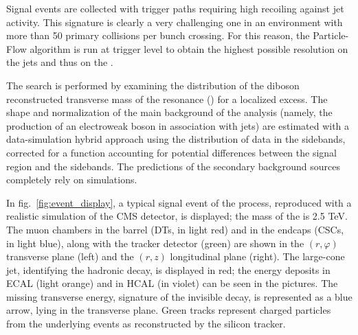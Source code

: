 \noindent Signal events are collected with trigger paths requiring high \met recoiling against jet activity. This signature is clearly a very challenging one in an environment with more than 50 primary collisions per bunch crossing. For this reason, the Particle-Flow algorithm is run at trigger level to obtain the highest possible resolution on the jets and thus on the \met.

\noindent The search is performed by examining the distribution of the diboson reconstructed transverse mass of the resonance \VZ (\mtVZ) for a localized excess. The shape and normalization of the main background of the analysis (namely, the production of an electroweak boson in association with jets) are estimated with a data-simulation hybrid approach using the distribution of data in the sidebands, corrected for a function accounting for potential differences between the signal region and the sidebands. The predictions of the secondary background sources completely rely on simulations.

\noindent In fig.~\ref{fig:event_display}, a typical signal event of the \Wpinv process, reproduced with a realistic simulation of the CMS detector, is displayed; the mass of the \Wp is 2.5 TeV. The muon chambers in the barrel (DTs, in light red) and in the endcaps (CSCs, in light blue), along with the tracker detector (green) are shown in the $(r, \varphi)$ transverse plane (left) and the $(r, z)$ longitudinal plane (right). The large-cone jet, identifying the \W hadronic decay, is displayed in red; the energy deposits in ECAL (light orange) and in HCAL (in violet) can be seen in the pictures. The missing transverse energy, signature of the \Z invisible decay, is represented as a blue arrow, lying in the transverse plane. %
Green tracks represent charged particles from the underlying events as reconstructed by the silicon tracker.

